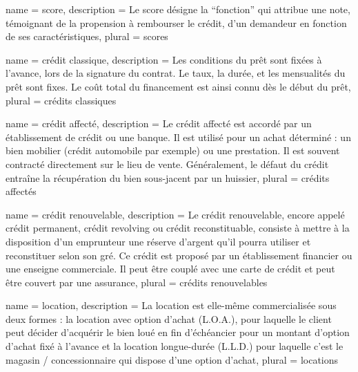 










{
	name = score,
	description = {Le score désigne la ``fonction'' qui attribue une note, témoignant de la propension à rembourser le crédit, d'un demandeur en fonction de ses caractéristiques},
	plural = scores
}



{
	name = crédit classique,
	description = {Les conditions du prêt sont fixées à l’avance, lors de la signature du contrat. Le taux, la durée, et les mensualités du prêt sont fixes. Le coût total du financement est ainsi connu dès le début du prêt},
	plural = crédits classiques
}

{
	name = crédit affecté,
	description = {Le crédit affecté est accordé par un établissement de crédit ou une banque. Il est utilisé pour un achat déterminé : un bien mobilier (crédit automobile par exemple) ou une prestation. Il est souvent contracté directement sur le lieu de vente. Généralement, le défaut du crédit entraîne la récupération du bien sous-jacent par un huissier},
	plural = crédits affectés
}

{
	name = crédit renouvelable,
	description = {Le crédit renouvelable, encore appelé crédit permanent, crédit revolving ou crédit reconstituable, consiste à mettre à la disposition d'un emprunteur une réserve d'argent qu'il pourra utiliser et reconstituer selon son gré. Ce crédit est proposé par un établissement financier ou une enseigne commerciale. Il peut être couplé avec une carte de crédit et peut être couvert par une assurance},
	plural = crédits renouvelables
}

{
	name = location,
	description = {La location est elle-même commercialisée sous deux formes : la location avec option d'achat (L.O.A.), pour laquelle le client peut décider d'acquérir le bien loué en fin d'échéancier pour un montant d'option d'achat fixé à l'avance et la location longue-durée (L.L.D.) pour laquelle c'est le magasin / concessionnaire qui dispose d'une option d'achat},
	plural = locations
}

